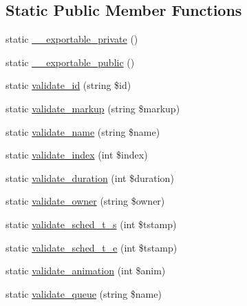 \subsection*{Static Public Member Functions}
\begin{DoxyCompactItemize}
\item 
static \hyperlink{classlibresignage_1_1common_1_1php_1_1slide_1_1Slide_afa1f0aa9b6b11b00094ecbc2db017965}{\+\_\+\+\_\+exportable\+\_\+private} ()
\item 
static \hyperlink{classlibresignage_1_1common_1_1php_1_1slide_1_1Slide_a5e72ba73379a39540bae30d8cbfc39ae}{\+\_\+\+\_\+exportable\+\_\+public} ()
\item 
static \hyperlink{classlibresignage_1_1common_1_1php_1_1slide_1_1Slide_a060058082585b1ed9b7226f01ad376cc}{validate\+\_\+id} (string \$id)
\item 
static \hyperlink{classlibresignage_1_1common_1_1php_1_1slide_1_1Slide_a390a7bca0562fb0945cd694c6f7e7dcd}{validate\+\_\+markup} (string \$markup)
\item 
static \hyperlink{classlibresignage_1_1common_1_1php_1_1slide_1_1Slide_ae4f4b8ee16cabd48cab20d1ec62d5639}{validate\+\_\+name} (string \$name)
\item 
static \hyperlink{classlibresignage_1_1common_1_1php_1_1slide_1_1Slide_a77792fc7026c05a530644dddf5eadc45}{validate\+\_\+index} (int \$index)
\item 
static \hyperlink{classlibresignage_1_1common_1_1php_1_1slide_1_1Slide_a3723b3c7b0c291cdfe26381af7fd5a28}{validate\+\_\+duration} (int \$duration)
\item 
static \hyperlink{classlibresignage_1_1common_1_1php_1_1slide_1_1Slide_a7e32cde7136c18a7150381650b6758a6}{validate\+\_\+owner} (string \$owner)
\item 
static \hyperlink{classlibresignage_1_1common_1_1php_1_1slide_1_1Slide_ad72fcaca412b7c9afe31cd5902b42457}{validate\+\_\+sched\+\_\+t\+\_\+s} (int \$tstamp)
\item 
static \hyperlink{classlibresignage_1_1common_1_1php_1_1slide_1_1Slide_acd01eb2b7ebb3e65969995d7893b8cff}{validate\+\_\+sched\+\_\+t\+\_\+e} (int \$tstamp)
\item 
static \hyperlink{classlibresignage_1_1common_1_1php_1_1slide_1_1Slide_a5f6d4c1788c842d8f840bd6f3d8c4dca}{validate\+\_\+animation} (int \$anim)
\item 
static \hyperlink{classlibresignage_1_1common_1_1php_1_1slide_1_1Slide_a47e245fb24508ab3a69ba3571c601c33}{validate\+\_\+queue} (string \$name)
\item 

\end{DoxyCompactItemize}

